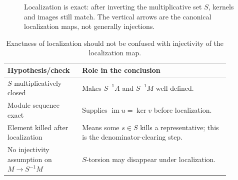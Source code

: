 \begin{figure}[htbp]
\centering
{}
\caption{Localization is exact: after inverting the multiplicative set $S$, kernels and
images still match. The vertical arrows are the canonical localization maps, not
generally injections.}
\label{fig:v07-c07-localization-exactness}
\end{figure}

\begin{table}[htbp]
\centering\small
\begin{tabular}{p{0.27\linewidth}p{0.61\linewidth}}
\toprule
Hypothesis/check & Role in the conclusion\\
\midrule
$S$ multiplicatively closed & Makes $S^{-1}A$ and $S^{-1}M$ well defined.\\
Module sequence exact & Supplies $\operatorname{im}u=\ker v$ before localization.\\
Element killed after localization & Means some $s\in S$ kills a representative; this is the denominator-clearing step.\\
No injectivity assumption on $M\to S^{-1}M$ & $S$-torsion may disappear under localization.\\
\bottomrule
\end{tabular}
\caption{Exactness of localization should not be confused with injectivity of the localization map.}
\label{tab:v07-c07-localization-hypotheses}
\end{table}
